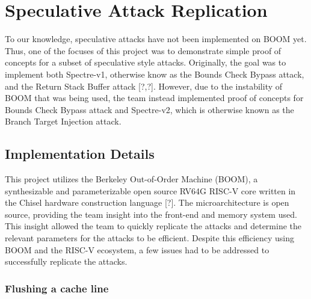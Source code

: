 \section{Speculative Attack Replication}

To our knowledge, speculative attacks have not been implemented on BOOM yet. Thus,
one of the focuses of this project was to demonstrate simple proof of concepts for a
subset of speculative style attacks. Originally, the goal was to implement both 
Spectre-v1, otherwise know as the Bounds Check Bypass attack, and the Return Stack Buffer attack [?,?].
However, due to the instability of BOOM that was being used, the team instead implemented
proof of concepts for Bounds Check Bypass attack and Spectre-v2, which is otherwise known as the
Branch Target Injection attack.

\subsection{Implementation Details}

This project utilizes the Berkeley Out-of-Order Machine (BOOM), a synthesizable and 
parameterizable open source RV64G RISC-V core written in the Chisel hardware construction language [?]. 
The microarchitecture is open source, providing the team insight into the front-end and memory system
used. This insight allowed the team to quickly replicate the attacks and determine the relevant parameters
for the attacks to be efficient. Despite this efficiency using BOOM and the RISC-V ecosystem, a few issues
had to be addressed to successfully replicate the attacks.

\subsubsection{Flushing a cache line}



